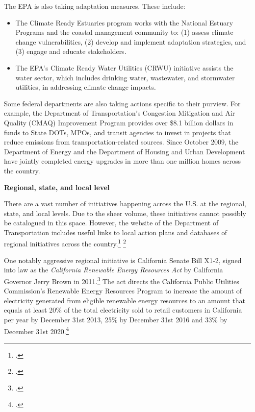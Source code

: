 The EPA is also taking adaptation measures. These include:	
\begin{itemize}
	\item The Climate Ready Estuaries program works with the National Estuary Programs and the coastal management community to: (1) assess climate change vulnerabilities, (2) develop and implement adaptation strategies, and (3) engage and educate stakeholders.
	\item The EPA's Climate Ready Water Utilities (CRWU) initiative assists the water sector, which includes drinking water, wastewater, and stormwater utilities, in addressing climate change impacts.
\end{itemize}
	
	

Some federal departments are also taking actions specific to their purview. For example, the Department of Transportation’s Congestion Mitigation and Air Quality (CMAQ) Improvement Program provides over \$8.1 billion dollars in funds to State DOTs, MPOs, and transit agencies to invest in projects that reduce emissions from transportation-related sources.  Since October 2009, the Department of Energy and the Department of Housing and Urban Development have jointly completed energy upgrades in more than one million homes across the country.



\textbf{Regional, state, and local level}



There are a vast number of initiatives happening across the U.S. at the regional, state, and local levels. 
Due to the sheer volume, these initiatives cannot possibly be catalogued in this space. 
However, the website of the Department of Transportation includes useful links to local action plans and databases of regional initiatives across the country.\footcite[][]{USDTaction} \footcite[][]{USDTinitiatives}



One notably aggressive regional initiative is California Senate Bill X1-2, signed into law as the \emph{California Renewable Energy Resources Act} by California Governor Jerry Brown in 2011.\footcite[][]{CaliSBX12}
The act directs the California Public Utilities Commission's Renewable Energy Resources Program to increase the amount of electricity generated from eligible renewable energy resources to an amount that equals at least 20\% of the total electricity sold to retail customers in California per year by December 31st 2013, 25\% by December 31st 2016 and 33\% by December 31st 2020.\footcite[][]{CaliforniaRenewableOverview}



